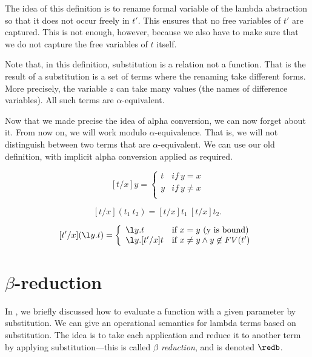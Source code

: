 The idea of this definition is to rename formal variable of the lambda
abstraction so that it does not occur freely in $t'$.  This ensures
that no free variables of $t'$ are captured.  This is not enough,
however, because we also have to make sure that we do not capture the
free variables of $t$ itself. 

Note that, in this definition, substitution is a relation not a
function.  That is the result of a substitution is a set of terms
where the renaming take different forms.  More precisely, the variable
$z$ can take many values (the names of difference variables).  All
such terms are $\alpha$-equivalent. 

Now that we made precise the idea of alpha conversion, we can now
forget about it.  From now on, we will work modulo
$\alpha$-equivalence.  That is, we will not distinguish between two
terms that are $\alpha$-equivalent.  We can use our old definition,
with implicit alpha conversion applied as required.


\begin{definition}
\label{def:lambda:sub::sub-final}
\[
[t/x]y = \left\{ \begin{array}{ll}
        t & if~y = x \\
        y & if~y\neq x \\
        \end{array} \right.
\]


\[
[t/x](t_1~t_2) = [t/x]t_1~[t/x]t_2.
 \]

\[
[t'/x](\l y.t) = 
\left\{ \begin{array}{ll}

\l y.t &\mbox{if}~ x = y \mbox{ (y is bound)} \\

\l y.[t'/x]t &\mbox{if}~ x \neq y \land y \not \in FV(t') \\

\end{array} \right. 
\]
\end{definition}

\section{$\beta$-reduction}

In , we briefly discussed how to evaluate a
function with a given parameter by substitution.  We can give an
operational semantics for lambda terms based on substitution.  The
idea is to take each application and reduce it to another term by
applying substitution---this is called \emph{$\beta$ reduction}, and is
denoted $\redb$.

